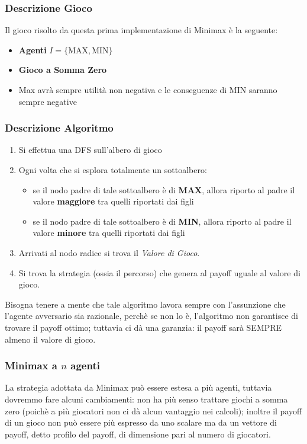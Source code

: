 \subsubsection{Descrizione Gioco}
Il gioco risolto da questa prima implementazione di Minimax è la seguente:
\begin{itemize}
    \item \textbf{Agenti} $I = \{\mbox{MAX},\mbox{MIN}\}$
    \item \textbf{Gioco a Somma Zero}
    \item Max avrà sempre utilità non negativa e le conseguenze di MIN saranno sempre negative
\end{itemize}

\subsubsection{Descrizione Algoritmo}
\begin{enumerate}
    \item Si effettua una DFS sull'albero di gioco
    \item Ogni volta che si esplora totalmente un sottoalbero:
        \begin{itemize}
            \item se il nodo padre di tale sottoalbero è di \textbf{MAX}, allora riporto al padre il valore \textbf{maggiore} tra quelli riportati dai figli
            \item se il nodo padre di tale sottoalbero è di \textbf{MIN}, allora riporto al padre il valore \textbf{minore} tra quelli riportati dai figli
        \end{itemize}
    \item Arrivati al nodo radice si trova il \textit{Valore di Gioco}.
    \item Si trova la strategia (ossia il percorso) che genera al payoff uguale al valore di gioco.
\end{enumerate}
Bisogna tenere a mente che tale algoritmo lavora sempre con l'assunzione che l'agente avversario sia razionale, perchè se non lo è,
l'algoritmo non garantisce di trovare il payoff ottimo; tuttavia ci dà una garanzia: il payoff sarà SEMPRE almeno il valore di gioco.

\subsubsection{Minimax a $n$ agenti}
La strategia adottata da Minimax può essere estesa a più agenti, tuttavia dovremmo fare alcuni cambiamenti: non ha più senso trattare 
giochi a somma zero (poichè a più giocatori non ci dà alcun vantaggio nei calcoli); inoltre il payoff di un gioco non può essere
più espresso da uno scalare ma da un vettore di payoff, detto profilo del payoff, di dimensione pari al numero di giocatori.